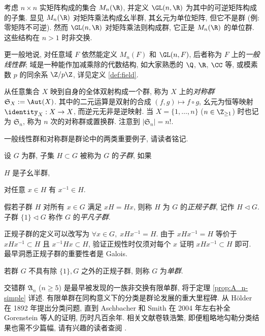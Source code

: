 \begin{example}[一般线性群]
	考虑 $n \times n$ 实矩阵构成的集合 $M_n(\R)$, 并定义 $\GL(n, \R)$ 为其中的可逆矩阵构成的子集. 显见 $M_n(\R)$ 对矩阵乘法构成幺半群, 其幺元为单位矩阵, 但它不是群 (例: 零矩阵不可逆). 然而 $\GL(n, \R)$ 对矩阵乘法则构成群, 它正是 $M_n(\R)$ 的单位群. 这些结构在 $n > 1$ 时非交换.
	
	更一般地说,  对任意域 $F$ 依然能定义 $M_n(F)$ 和 $\GL(n,F)$, 后者称为 $F$ 上的\emph{一般线性群}; 域是一种能作加减乘除的代数结构, 如大家熟悉的 $\Q$, $\R$, $\CC$ 等, 或模素数 $p$ 的同余系 $\Z/p\Z$, 详见定义 \ref{def:field}.
\end{example}

\begin{example}[对称群]\label{eg:symmetric-group}
	从任意集合 $X$ 映到自身的全体双射构成一个群, 称为 $X$ 上的\emph{对称群} $\mathfrak{S}_X := \Aut(X)$. 其中的二元运算是双射的合成 $(f, g) \mapsto f \circ g$, 幺元为恒等映射 $\identity_X: X \to X$, 而逆元无非是逆映射. 当 $X = \{1, \ldots, n\}$ ($n \in \Z_{\geq 1}$) 时也记为 $\mathfrak{S}_n$, 称为 $n$ 次的对称群或置换群. 注意到 $|\mathfrak{S}_n| = n!$.
\end{example}
一般线性群和对称群是群论中的两类重要例子, 请读者铭记.

\begin{definition}[子群和正规子群]
	设 $G$ 为群, 子集 $H \subset G$ 被称为 $G$ 的\emph{子群}, 如果
	\begin{inparaenum}[(i)]
		\item $H$ 是子幺半群,
		\item 对任意 $x \in H$ 有 $x^{-1} \in H$.
	\end{inparaenum}
	假若子群 $H$ 对所有 $x \in G$ 满足 $xH = Hx$, 则称 $H$ 为 $G$ 的\emph{正规子群}, 记作 $H \lhd G$. 子群 $\{1\} \lhd G$ 称作 $G$ 的\emph{平凡子群}.
\end{definition}
正规子群的定义可以改写为 $\forall x \in G, \; xHx^{-1} = H$. 由于 $xHx^{-1} = H$ 等价于 $xHx^{-1} \subset H$ 且 $x^{-1} H x \subset H$, 验证正规性时仅须对每个 $x$ 证明 $xHx^{-1} \subset H$ 即可. 最早洞悉正规子群的重要性者是 Galois.

\begin{definition}[单群]
	若群 $G$ 不具有除 $\{1\}, G$ 之外的正规子群, 则称 $G$ 为\emph{单群}.
\end{definition}
交错群 $\mathfrak{A}_n$ ($n \geq 5$) 是最早被发现的一族非交换有限单群, 将于定理 \ref{prop:A_n-simple} 详述. 有限单群在同构意义下的分类是群论发展的重大里程碑. 从 Hölder 在 1892 年提出分类问题, 直到 Aschbacher 和 Smith 在 2004 年左右补全 Gorenstein 等人的证明, 历时凡百余年. 相关文献卷轶浩繁, 即便粗略地勾勒分类结果也需不少篇幅, 请有兴趣的读者查阅 \cite{Wil09}.

